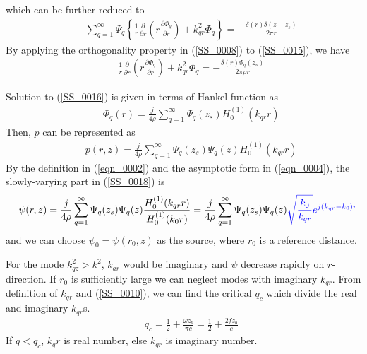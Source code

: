 \documentclass[journal,onecolumn]{IEEEtran}
\begin{document}
which can be further reduced to
\begin{eqnarray}
&&\sum_{q = 1}^{\infty} \Psi_q  \left\{ 
\frac{1}{r} \frac{\partial }{\partial r} \left( r \frac{\partial \Phi_q}{\partial r} \right) 
+ k_{qr}^2 \Phi_q \right \} = - \frac{\delta (r) \delta(z - z_s)}{2 \pi r}
\label{SS_0015} 
\end{eqnarray}
By applying the orthogonality property in (\ref{SS_0008}) to (\ref{SS_0015}), we have
\begin{eqnarray}
&&\frac{1}{r} \frac{\partial }{\partial r} \left(r \frac{\partial \Phi_q}{\partial r} \right) + k_{qr}^2 \Phi_q 
= - \frac{\delta (r) \Psi_q(z_s)}{2 \pi \rho r}
\label{SS_0016}
\end{eqnarray}
 
Solution to (\ref{SS_0016}) is given in terms of Hankel function as \cite{COA}
\begin{eqnarray}
&&\Phi_q (r) = \frac{j}{4 \rho}\sum_{q = 1}^\infty \Psi_q(z_s) H_0^{(1)} ( k_{qr} r )
\label{SS_0017}
\end{eqnarray}
Then, $p$ can be represented as
\begin{eqnarray}
&&p(r, z) = \frac{j}{4 \rho}\sum_{q = 1}^\infty \Psi_q(z_s) \Psi_q(z)  H_0^{(1)}(k_{qr} r)
\label{SS_0018}
\end{eqnarray}
By the definition in (\ref{eqn_0002}) and the asymptotic form in (\ref{eqn_0004}), the slowly-varying part in (\ref{SS_0018}) is
\begin{eqnarray}
&&\psi(r, z) = \frac{j}{4 \rho} \sum_{q = 1}^\infty \Psi_q(z_s) \Psi_q(z) \frac{ H_0^{(1)}(k_{qr} r)}{H_0^{(1)}(k_0 r)} 
= \frac{j}{4 \rho} \sum_{q = 1}^\infty \Psi_q(z_s) \Psi_q(z) 
\textcolor{blue}{\sqrt{\frac{k_0}{k_{qr}}} e^{j(k_{qr} - k_0) r}}
\label{SS_0019}
\end{eqnarray}
and we can choose $\psi_0 = \psi(r_0, z)$ as the source, where $r_0$ is a reference distance.

For the mode $k_{qz}^2 > k^2$, $k_{ar}$ would be imaginary and $\psi$ decrease rapidly on $r$-direction. If $r_0$ is sufficiently large we can neglect modes with imaginary $k_{qr}$.
From definition of $k_{qr}$ and (\ref{SS_0010}), we can find the critical $q_c$ which divide the real and imaginary $k_{qr}$s.
\begin{eqnarray}
&&q_c = \frac{1}{2} + \frac{\omega z_b}{\pi c} = \frac{1}{2} + \frac{2 f z_b}{c}
\label{SS_0020}
\end{eqnarray}
If $q < q_c$, $k_qr$ is real number, else $k_{qr}$ is imaginary number.
\end{document}

